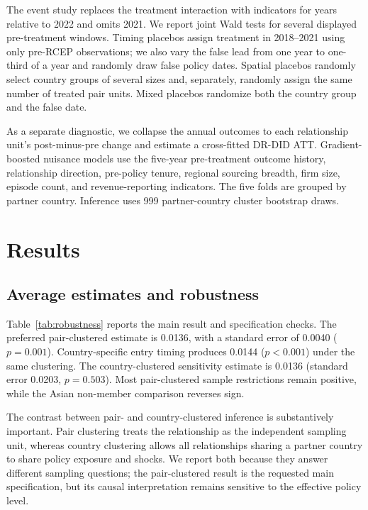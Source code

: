 \documentclass[preprint,12pt,authoryear]{elsarticle}
\begin{document}
The event study replaces the treatment interaction with indicators for years relative to 2022 and omits 2021. We report joint Wald tests for several displayed pre-treatment windows. Timing placebos assign treatment in 2018--2021 using only pre-RCEP observations; we also vary the false lead from one year to one-third of a year and randomly draw false policy dates. Spatial placebos randomly select country groups of several sizes and, separately, randomly assign the same number of treated pair units. Mixed placebos randomize both the country group and the false date.

As a separate diagnostic, we collapse the annual outcomes to each relationship unit's post-minus-pre change and estimate a cross-fitted DR-DID ATT. Gradient-boosted nuisance models use the five-year pre-treatment outcome history, relationship direction, pre-policy tenure, regional sourcing breadth, firm size, episode count, and revenue-reporting indicators. The five folds are grouped by partner country. Inference uses 999 partner-country cluster bootstrap draws.

\section{Results}

\subsection{Average estimates and robustness}

Table~\ref{tab:robustness} reports the main result and specification checks. The preferred pair-clustered estimate is 0.0136, with a standard error of 0.0040 ($p=0.001$). Country-specific entry timing produces 0.0144 ($p<0.001$) under the same clustering. The country-clustered sensitivity estimate is 0.0136 (standard error 0.0203, $p=0.503$). Most pair-clustered sample restrictions remain positive, while the Asian non-member comparison reverses sign.

The contrast between pair- and country-clustered inference is substantively important. Pair clustering treats the relationship as the independent sampling unit, whereas country clustering allows all relationships sharing a partner country to share policy exposure and shocks. We report both because they answer different sampling questions; the pair-clustered result is the requested main specification, but its causal interpretation remains sensitive to the effective policy level.
\end{document}
